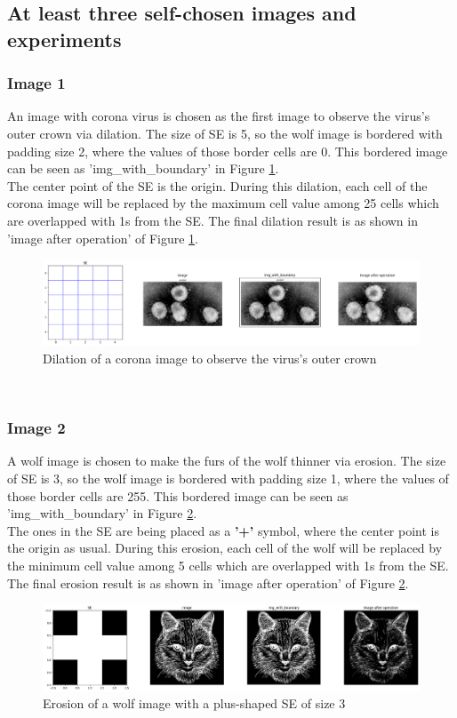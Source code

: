 \documentclass{article}
\begin{document}
\subsection{At least three self-chosen images and experiments}
\subsubsection{Image 1}
An image with corona virus is chosen as the first image to observe the virus’s outer crown via dilation. The size of SE is 5, so the wolf image is bordered with padding size 2, where the values of those border cells are 0. This bordered image can be seen as 'img\_with\_boundary' in Figure \ref{fig:corona}. \\
The center point of the SE is the origin. During this dilation, each cell of the corona image will be replaced by the maximum cell value among 25 cells which are overlapped with 1s from the SE. The final dilation result is as shown in 'image after operation' of Figure \ref{fig:corona}.\\
\begin{figure}[h!]
\includegraphics[width=\linewidth]{images/corona_output.png}
\caption{Dilation of a corona image to observe the virus's outer crown}
\label{fig:corona}
\end{figure}
\\ 

\subsubsection{Image 2}
A wolf image is chosen to make the furs of the wolf thinner via erosion. The size of SE is 3, so the wolf image is bordered with padding size 1, where the values of those border cells are 255. This bordered image can be seen as 'img\_with\_boundary' in Figure \ref{fig:wolf}. \\
The ones in the SE are being placed as a \textbf{'+'} symbol, where the center point is the origin as usual. During this erosion, each cell of the wolf will be replaced by the minimum cell value among 5 cells which are overlapped with 1s from the SE. The final erosion result is as shown in 'image after operation' of Figure \ref{fig:wolf}.\\
\begin{figure}[h!]
\includegraphics[width=\linewidth]{images/wolf.png}
\caption{Erosion of a wolf image with a plus-shaped SE of size 3}
\label{fig:wolf}
\end{figure}
\\ 
\end{document}
